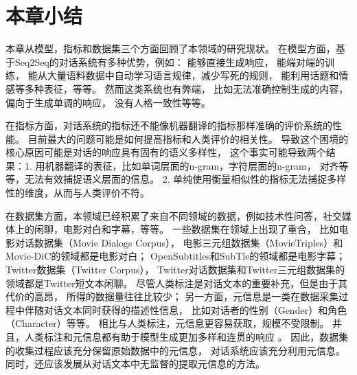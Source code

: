 \section{本章小结}\label{sec:rw_conclusion}
本章从模型，指标和数据集三个方面回顾了本领域的研究现状。
在模型方面，基于Seq2Seq的对话系统有多种优势，例如：
能够直接生成响应，
能端对端的训练，
能从大量语料数据中自动学习语言规律，减少写死的规则，
能利用话题和情感等多种表征，等等。
然而这类系统也有弊端，
比如无法准确控制生成的内容，
偏向于生成单调的响应，
没有人格一致性等等。

在指标方面，对话系统的指标还不能像机器翻译的指标那样准确的评价系统的性能。
目前最大的问题可能是如何提高指标和人类评价的相关性。
导致这个困境的核心原因可能是对话的响应具有固有的语义多样性，
这个事实可能导致两个结果：1. 用机器翻译的表征，比如单词层面的n-gram，字符层面的n-gram，
对齐等等，无法有效捕捉语义层面的信息。
2. 单纯使用衡量相似性的指标无法捕捉多样性的维度，从而与人类评价不符。

在数据集方面，本领域已经积累了来自不同领域的数据，例如技术性问答，社交媒体上的闲聊，电影对白和字幕，等等。
一些数据集在领域上出现了重合，
比如电影对话数据集（Movie Dialogs Corpus），
电影三元组数据集（MovieTriples）和Movie-DiC的领域都是电影对白；
OpenSubtitles和SubTle的领域都是电影字幕；
Twitter数据集（Twitter Corpus），
Twitter对话数据集和Twitter三元组数据集的领域都是Twitter短文本闲聊。
尽管人类标注是对话文本的重要补充，但是由于其代价的高昂，
所得的数据量往往比较少；
另一方面，元信息是一类在数据采集过程中伴随对话文本同时获得的描述性信息，
比如对话者的性别（Gender）和角色（Character）等等。
相比与人类标注，元信息更容易获取，规模不受限制。
并且，人类标注和元信息都有助于模型生成更加多样和连贯的响应
。
因此，数据集的收集过程应该充分保留原始数据中的元信息，
对话系统应该充分利用元信息。
同时，还应该发展从对话文本中无监督的提取元信息的方法。
